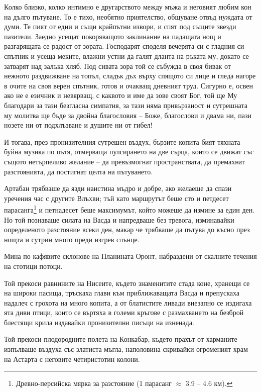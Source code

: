 \documentclass[oneside,10pt]{memoir}
\begin{document}
Колко близко, колко интимно е другарството между мъжа и неговият любим кон на
дълго пътуване. То е тихо, необятно приятелство, общуване отвъд нуждата от думи.
Те пият от едни и същи крайпътни извори, и спят под същите звезди пазители.
Заедно усещат покоряващото заклинание на падащата нощ и разгарящата се радост от
зората. Господарят споделя вечерята си с гладния си спътник и усеща меките,
влажни устни да галят дланта на ръката му, докато се затварят над залъка хляб.
Под сивата зора той се събужда в своя бивак от нежното раздвижване на топъл,
сладък дъх върху спящото си лице и гледа нагоре в очите на своя верен спътник,
готов и очакващ дневният труд. Сигурно е, освен ако не е езичник и невярващ, с
каквото и име да зове своят Бог, той ще Му благодари за тази безгласна симпатия,
за тази няма привързаност и сутрешната му молитва ще бъде за двойна благословия
-- Боже, благослови и двама ни, пази нозете ни от подхлъзване и душите ни от
гибел!

И тогава, през пронизителния сутрешен въздух, бързите копита бият тяхната буйна
музика по пътя, отмерваща пулсирането на две сърца, които се движат със същото
нетърпеливо желание -- да превъзмогнат пространствата, да премахнат
разстоянията, да постигнат целта на пътуването.

Артабан трябваше да язди наистина мъдро и добре, ако желаеше да спази уречения
час с другите Влъхви; тъй като маршрутът беше сто и петдесет
парасанга\footnote{Древно-персийска мярка за разстояние (1 парасанг $\approx$
3.9 -- 4.6 км).} и петнадесет беше максимумът, който можеше да измине за един
ден. Но той познаваше силата на Васда и напредваше без тревога, изминавайки
определеното разстояние всеки ден, макар че трябваше да пътува до късно през
нощта и сутрин много преди изгрев слънце.

Мина по кафявите склонове на Планината Оронт, набраздени от скалните течения
на стотици потоци.

Той прекоси равнините на Нисеите, където знаменитите стада коне, хранещи се на
широки пасища, тръскаха глави към приближаващата Васда и препускаха надалеч с
грохота на много копита, а от блатистите ливади внезапно се издигаха ята диви
птици, които се въртяха в големи кръгове с размахването на безброй блестящи
крила издавайки пронизителни писъци на изненада.

Той прекоси плодородните полета на Конкабар, където прахът от харманите
изпълваше въздуха със златиста мъгла, наполовина скривайки огроменият храм на
Астарта с неговите четиристотин колони.
\end{document}
